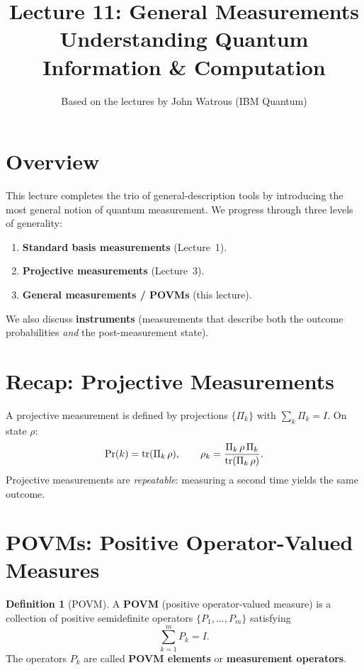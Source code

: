\documentclass[11pt]{article}
\title{\textbf{Lecture 11: General Measurements} \\ \large Understanding Quantum Information \& Computation}
\author{Based on the lectures by John Watrous (IBM Quantum)}
\date{}
\theoremstyle{definition}
\newtheorem{definition}{Definition}[section]
\begin{document}
\maketitle
\tableofcontents
\newpage

\section{Overview}

This lecture completes the trio of general-description tools by introducing the most general notion of quantum measurement.  We progress through three levels of generality:

\begin{enumerate}
    \item \textbf{Standard basis measurements} (Lecture~1).
    \item \textbf{Projective measurements} (Lecture~3).
    \item \textbf{General measurements / POVMs} (this lecture).
\end{enumerate}

We also discuss \textbf{instruments} (measurements that describe both the outcome probabilities \emph{and} the post-measurement state).

\section{Recap: Projective Measurements}

A projective measurement is defined by projections $\{\Pi_k\}$ with $\sum_k\Pi_k=I$.  On state $\rho$:
\[
    \Pr(k) = \tr(\Pi_k\,\rho),
    \qquad
    \rho_k = \frac{\Pi_k\,\rho\,\Pi_k}{\tr(\Pi_k\,\rho)}.
\]
Projective measurements are \emph{repeatable}: measuring a second time yields the same outcome.

\section{POVMs: Positive Operator-Valued Measures}

\begin{definition}[POVM]
A \textbf{POVM} (positive operator-valued measure) is a collection of positive semidefinite operators $\{P_1,\dots,P_m\}$ satisfying
\[
    \sum_{k=1}^{m}P_k = I.
\]
The operators $P_k$ are called \textbf{POVM elements} or \textbf{measurement operators}.
\end{definition}
\end{document}
